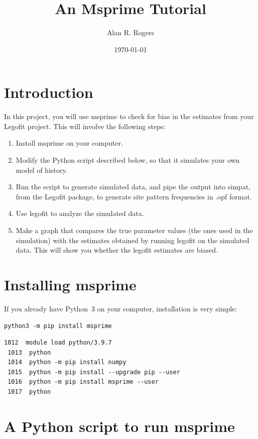 \documentclass[11pt]{article}
\begin{document}
\title{An Msprime Tutorial}
\author{Alan R. Rogers}
\date{\today}
\maketitle

\section{Introduction}
\label{sec.intro}
In this project, you will use msprime \citep{Kelleher:PLO-12-1} to
check for bias in the estimates from your Legofit project. This will
involve the following steps:
\begin{enumerate}
\item Install msprime on your computer.
\item Modify the Python script described below, so that it simulates
  your own model of history.
\item Run the script to generate simulated data, and pipe the output
  into simpat, from the Legofit package, to generate site pattern
  frequencies in .opf format.
\item Use legofit to analyze the simulated data.
\item Make a graph that compares the true parameter values (the ones
  used in the simulation) with the estimates obtained by running
  legofit on the simulated data. This will show you whether the
  legofit estimates are biased.
\end{enumerate}

\section{Installing msprime}
If you already have Python~3 on your computer, installation is very
simple:
\begin{verbatim}
python3 -m pip install msprime
\end{verbatim}

\begin{verbatim}
1012  module load python/3.9.7
 1013  python
 1014  python -m pip install numpy
 1015  python -m pip install --upgrade pip --user
 1016  python -m pip install msprime --user
 1017  python
\end{verbatim}

\section{A Python script to run msprime}
\end{document}
